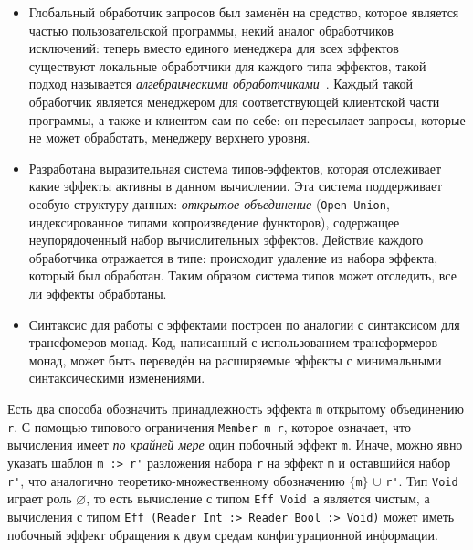     \begin{itemize}
      \item
    Глобальный обработчик запросов был заменён на средство, которое является частью
    пользовательской программы, некий аналог обработчиков исключений: теперь вместо
    единого менеджера для всех эффектов существуют локальные обработчики для каждого
    типа эффектов, такой подход называется \emph{алгебраическими
    обработчиками}~\cite{effAndHandl}. Каждый такой обработчик является менеджером
    для соответствующей клиентской части программы, а также и клиентом сам по себе:
    он пересылает запросы, которые не может обработать, менеджеру верхнего уровня.
      \item
    Разработана выразительная система типов-эффектов, которая отслеживает какие
    эффекты активны в данном вычислении. Эта система поддерживает особую структуру
    данных: \emph{открытое объединение} (\lstinline{Open Union}, индексированное
    типами копроизведение функторов), содержащее неупорядоченный набор
    вычислительных эффектов. Действие каждого обработчика отражается в типе:
    происходит удаление из набора эффекта, который был обработан. Таким
    образом система типов может отследить, все ли эффекты обработаны.
      \item
    Синтаксис для работы с эффектами построен по аналогии с синтаксисом для
    трансфомеров монад. Код, написанный с использованием трансформеров монад,
    может быть переведён на расширяемые эффекты с минимальными синтаксическими
    изменениями.
    \end{itemize}

    Есть два способа обозначить принадлежность эффекта \lstinline{m} открытому
    объединению \lstinline{r}. С помощью типового ограничения
    \mbox{\lstinline{Member m r},} которое означает, что вычисления имеет
    \emph{по крайней мере} один побочный эффект \lstinline{m}. Иначе, можно явно
    указать шаблон \lstinline{m :> r'} разложения набора \lstinline{r} на
    эффект \lstinline{m} и оставшийся набор \lstinline{r'}, что аналогично
    теоретико-множественному обозначению $\{$\lstinline{m}$\}$ $\cup$
    \lstinline{r'}. Тип \lstinline{Void} играет роль $\varnothing$, то есть
    вычисление с типом \lstinline{Eff Void a} является чистым, а вычисления с
    типом \lstinline{Eff (Reader Int :> Reader Bool :> Void)} может иметь побочный
    эффект обращения к двум средам конфигурационной информации.

